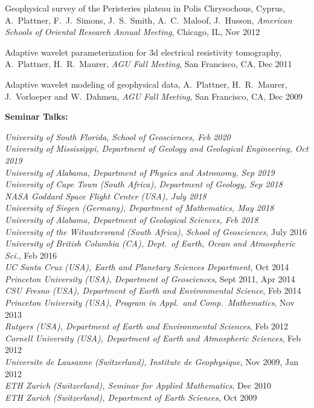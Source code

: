 \documentclass[10pt]{article}
\begin{document}
\spcp
Geophysical survey of the Peristeries plateau in Polis Chrysochous, Cyprus,
A.~Plattner, F.~J.~Simons, J.~S.~Smith, A.~C.~Maloof, J.~Husson,
\emph{American Schools of Oriental Research Annual Meeting}, Chicago, IL, Nov 2012

\spcp
Adaptive wavelet parameterization for 3d electrical resistivity tomography,
A.~Plattner, H.~R.~Maurer, 
\emph{AGU Fall Meeting}, San Francisco, CA, Dec 2011

\spcp
Adaptive wavelet modeling of geophysical data,
A.~Plattner, H.~R.~Maurer, J.~Vorloeper and W.~Dahmen, 
\emph{AGU Fall Meeting}, San Francisco, CA, Dec 2009




\spc
\textbf{\tsize Seminar Talks:}

\spcp
\emph{University of South Florida, School of Geosciences, Feb 2020}\\
\emph{University of Mississippi, Department of Geology and Geological Engineering, Oct 2019}\\
\emph{University of Alabama, Department of Physics and Astronomy, Sep 2019}\\
\emph{University of Cape Town (South Africa), Department of Geology, Sep 2018}\\
\emph{NASA Goddard Space Flight Center (USA), July 2018}\\
\emph{University of Siegen (Germany), Department of Mathematics, May 2018}\\
\emph{University of Alabama, Department of Geological Sciences, Feb 2018}\\
\emph{University of the Witwatersrand (South Africa), School of Geosciences}, July 2016\\
\emph{University of British Columbia (CA), Dept.~of Earth, Ocean and Atmospheric Sci.}, Feb 2016\\
\emph{UC Santa Cruz (USA), Earth and Planetary Sciences Department}, Oct 2014\\
\emph{Princeton University (USA), Department of Geosciences}, Sept  2011, Apr 2014\\
\emph{CSU Fresno (USA), Department of Earth and Environmental Science}, Feb 2014\\
\emph{Princeton University (USA), Program in Appl.~and Comp.~Mathematics}, Nov 2013\\
\emph{Rutgers (USA), Department of Earth and Environmental Sciences}, Feb 2012\\
\emph{Cornell University (USA), Department of Earth and Atmospheric Sciences}, Feb 2012\\
\emph{Universite de Lausanne (Switzerland), Institute de Geophysique}, Nov 2009, Jan 2012\\
\emph{ETH Zurich (Switzerland), Seminar for Applied Mathematics}, Dec 2010\\
\emph{ETH Zurich (Switzerland), Department of Earth Sciences}, Oct 2009
\end{document}
